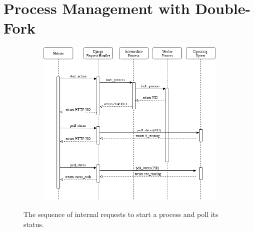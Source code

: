 \clearpage
\appendix
\section{Process Management with Double-Fork}\label{app:doublefork}
\begin{figure}[H]\label{fig:process_sequence}
	\centering
	\begin{subfigure}{1.2\linewidth}
		\centering
		\includegraphics[width=1.2\linewidth]{figs/process_sequence}
	\end{subfigure}
	\caption{The sequence of internal requests to start a process and poll its status.}
\end{figure}